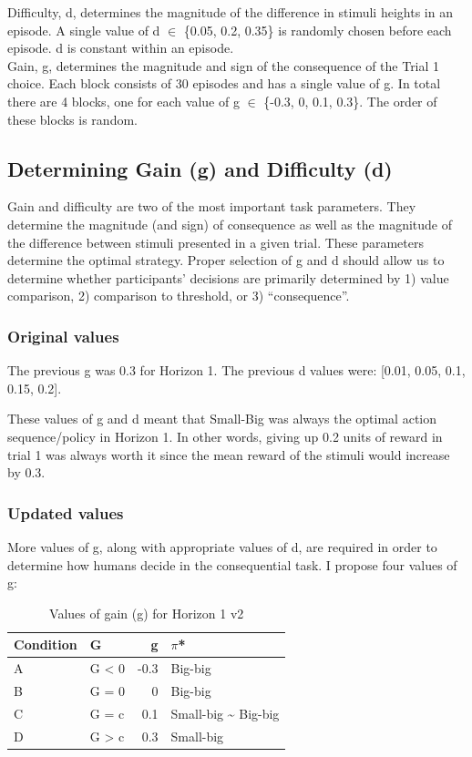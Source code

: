 \documentclass[11pt]{article}
\begin{document}
Difficulty, d, determines the magnitude of the difference in stimuli heights in an episode. A single value of d \(\in\) \{0.05, 0.2, 0.35\} is randomly chosen before each episode. d is constant within an episode.  \\
Gain, g, determines the magnitude and sign of the consequence of the Trial 1 choice. Each block consists of 30 episodes and has a single value of g. In total there are 4 blocks, one for each value of g \(\in\) \{-0.3, 0, 0.1, 0.3\}. The order of these blocks is random. \\
\subsection{Determining Gain (g) and Difficulty (d)}
\label{sec:org98d1912}
Gain and difficulty are two of the most important task parameters. They determine the magnitude (and sign) of consequence as well as the magnitude of the difference between stimuli presented in a given trial. These parameters determine the optimal strategy.
Proper selection of g and d should allow us to determine whether participants' decisions are primarily determined by 1) value comparison, 2) comparison to threshold, or 3) ``consequence''.
\subsubsection{Original values}
\label{sec:org72e5117}
The previous g was 0.3 for Horizon 1. The previous d values were: [0.01, 0.05, 0.1, 0.15, 0.2].

These values of g and d meant that Small-Big was always the optimal action sequence/policy in Horizon 1. In other words, giving up 0.2 units of reward in trial 1 was always worth it since the mean reward of the stimuli would increase by 0.3.
\subsubsection{Updated values}
\label{sec:orge945ab2}
More values of g, along with appropriate values of d, are required in order to determine how humans decide in the consequential task. I propose four values of g:

\begin{table}[htbp]
\caption{\label{Table 1}Values of gain (g) for Horizon 1 v2}
\centering
\begin{tabular}{llrl}
\hline
Condition & G & g & \(\pi\)*\\
\hline
A & G < 0 & -0.3 & Big-big\\
B & G = 0 & 0 & Big-big\\
C & G = c & 0.1 & Small-big \textasciitilde{} Big-big\\
D & G > c & 0.3 & Small-big\\
\end{tabular}
\end{table}
\end{document}
